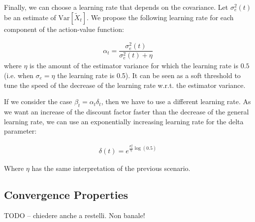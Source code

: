 \documentclass[conference]{IEEEtran}
\begin{document}
Finally, we can choose a learning rate that depends on the covariance. Let $\sigma_e^2(t)$ be an estimate of $\mathrm{Var}\left[\widetilde{X}_{t}\right]$. We propose the following learning rate for each component of the action-value function:

\begin{align}
 \alpha_t=\dfrac{\sigma_e^2(t)}{\sigma_e^2(t)+\eta}
\end{align}
where $\eta$ is the amount of the estimator variance for which the learning rate is $0.5$ (i.e. when $\sigma_e=\eta$ the learning rate is 0.5). It can be seen as a soft threshold to tune the speed of the decrease of the learning rate w.r.t. the estimator variance.

If we consider the case $\beta_t=\alpha_t\delta_t$, then we have to use a different learning rate. As we want an increase of the discount factor faster than the decrease of the general learning rate, we can use an exponentially increasing learning rate for the delta parameter:

\begin{align}\label{eq:delta_eq}
 \delta(t) = e^{\frac{\sigma_e^2}{\eta}\log(0.5)}
\end{align}

Where $\eta$ has the same interpretation of the previous scenario.

\subsection{Convergence Properties}

TODO -- chiedere anche a restelli. Non banale!
\end{document}
